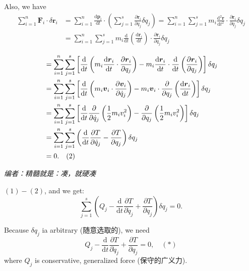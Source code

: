 Also, we have \begin{align*}
    \sum_{i = 1}^{n} \boldsymbol{F}_i \cdot \delta \boldsymbol{r}_i & = \sum_{i = 1}^{n} \frac{\mathrm{d} \boldsymbol{p}_i}{\mathrm{d}t} \cdot \left( \sum_{j = 1}^{s} \frac{\partial \boldsymbol{r}_i}{\partial q_j} \delta q_j \right) = \sum_{i = 1}^{n} \sum_{j = 1}^{s}  m_i \frac{\mathrm{d}^2 \boldsymbol{r}}{\mathrm{d}t^2} \cdot \frac{\partial \boldsymbol{r}_i}{\partial q_j} \delta q_j \\
    & = \sum_{i = 1}^{n} \sum_{j = 1}^{s}  m_i \frac{\mathrm{d}}{\mathrm{d}t} \left( \frac{\mathrm{d} \boldsymbol{r}_i}{\mathrm{d}t} \right) \cdot \frac{\partial \boldsymbol{r}_i}{\partial q_j} \delta q_j \\
\end{align*}
\begin{align*}    
    & = \sum_{i = 1}^{n} \sum_{j = 1}^{s}  \left[ \frac{\mathrm{d}}{\mathrm{d}t} \left( m_i \frac{\mathrm{d} \boldsymbol{r}_i}{\mathrm{d}t} \cdot \frac{\partial \boldsymbol{r}_i}{\partial q_j} \right) - m_i \frac{\mathrm{d} \boldsymbol{r}_i}{\mathrm{d}t} \cdot \frac{\mathrm{d}}{\mathrm{d}t} \left( \frac{\partial \boldsymbol{r}_i}{\partial q_j} \right) \right] \delta q_j \\
    & = \sum_{i = 1}^{n} \sum_{j = 1}^{s}  \left[ \frac{\mathrm{d}}{\mathrm{d}t} \left( m_i \boldsymbol{v}_i \cdot \frac{\partial \boldsymbol{v}_i}{\partial \dot{q}_j} \right) - m_i \boldsymbol{v}_i \cdot \frac{\partial}{\partial q_j} \left( \frac{\mathrm{d} \boldsymbol{r}_i}{\mathrm{d}t} \right) \right] \delta q_j \\
    & = \sum_{i = 1}^{n} \sum_{j = 1}^{s}  \left[ \frac{\mathrm{d}}{\mathrm{d}t} \frac{\partial}{\partial \dot{q}_j} \left( {1 \over 2} m_i  {v}_i^2 \right) - \frac{\partial}{\partial q_j} \left( {1 \over 2} m_i  {v}_i^2 \right) \right] \delta q_j \\
    & = \sum_{i = 1}^{n} \sum_{j = 1}^{s}  \left( \frac{\mathrm{d}}{\mathrm{d}t} \frac{\partial T}{\partial \dot{q}_j} - \frac{\partial T}{\partial q_j} \right) \delta q_j \\
    & = 0. \quad(2)
\end{align*}

\emph{编者：精髓就是：凑，就硬凑}

\((1) - (2)\), and we get:
\[\sum_{j = 1}^{s} \left( Q_j - \frac{\mathrm{d}}{\mathrm{d}t} \frac{\partial T}{\partial \dot{q}_j} + \frac{\partial T}{\partial q_j} \right) \delta q_j = 0.\]

Because \(\delta q_j\) ia arbitrary (随意选取的), we need
\[ Q_j - \frac{\mathrm{d}}{\mathrm{d}t} \frac{\partial T}{\partial \dot{q}_j} + \frac{\partial T}{\partial q_j} = 0, \quad(*)\]
where \(Q_j\) is conservative, generalized force (保守的广义力).

